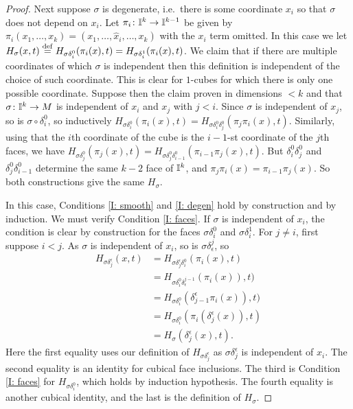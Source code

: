 \begin{proof}
	Next suppose $\sigma$ is degenerate, i.e.\ there is some coordinate $x_i$ so that $\sigma$ does not depend on $x_i$.
	Let $\pi_i \colon \mathbb{I}^k\to\mathbb{I}^{k-1}$ be given by $\pi_i(x_1,\ldots, x_k) = (x_1,\ldots, \hat x_i, \ldots, x_k)$ with the $x_i$ term omitted.
	In this case we let $H_\sigma(x,t) \stackrel{\mathrm{def}}{=} H_{\sigma \delta_i^0}(\pi_i(x),t) = H_{\sigma \delta_i^1}(\pi_i(x),t)$.
	We claim that if there are multiple coordinates of which $\sigma$ is independent then this definition is independent of the choice of such coordinate.
	This is clear for $1$-cubes for which there is only one possible coordinate.
	Suppose then the claim proven in dimensions $<k$ and that $\sigma \colon \mathbb{I}^k \to M$ is independent of $x_i$ and $x_j$ with $j<i$.
	Since $\sigma$ is independent of $x_j$, so is $\sigma \circ \delta_i^0$, so inductively $H_{\sigma \delta_i^0}(\pi_i(x),t) = H_{\sigma \delta_i^0\delta_j^0}(\pi_j\pi_i(x),t)$.
	Similarly, using that the $i$th coordinate of the cube is the $i-1$-st coordinate of the $j$th faces, we have $H_{\sigma \delta_j^0}(\pi_j(x),t) = H_{\sigma \delta_j^0\delta_{i-1}^0}(\pi_{i-1}\pi_j(x),t)$.
	But $\delta_i^0\delta_j^0$ and $\delta_j^0\delta_{i-1}^0$ determine the same $k-2$ face of $\mathbb{I}^k$, and $\pi_j\pi_i(x) = \pi_{i-1}\pi_j(x)$.
	So both constructions give the same $H_\sigma$.

	In this case, Conditions \eqref{I: smooth} and \eqref{I: degen} hold by construction and by induction.
	We must verify Condition \eqref{I: faces}.
	If $\sigma$ is independent of $x_i$, the condition is clear by construction for the faces $\sigma\delta_i^0$ and $\sigma\delta_i^1$.
	For $j\neq i$, first suppose $i<j$.
	As $\sigma$ is independent of $x_i$, so is $\sigma\delta^j_\epsilon$, so
	\begin{align*}
		H_{\sigma\delta_j^\epsilon}(x,t)& = H_{\sigma\delta_j^\epsilon \delta_i^0}(\pi_i(x),t)\\
		& = H_{\sigma \delta_i^0\delta^{j-1}_\epsilon}(\pi_i(x)),t)\\
		& = H_{\sigma \delta_i^0}(\delta_{j-1}^\epsilon\pi_i(x)),t)\\
		& = H_{\sigma \delta_i^0}(\pi_i(\delta_j^\epsilon(x)),t)\\
		& = H_\sigma(\delta_j^\epsilon(x),t).
	\end{align*}
	Here the first equality uses our definition of $H_{\sigma\delta_j^\epsilon}$ as $\sigma\delta_j^\epsilon$ is independent of $x_i$.
	The second equality is an identity for cubical face inclusions.
	The third is Condition \eqref{I: faces} for $H_{\sigma \delta_i^0}$, which holds by induction hypothesis.
	The fourth equality is another cubical identity, and the last is the definition of $H_\sigma$.


\end{proof}
